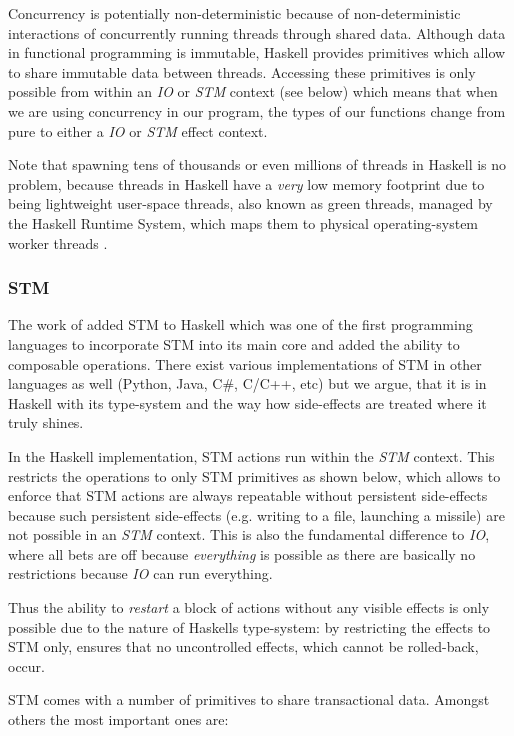 Concurrency is potentially non-deterministic because of non-deterministic interactions of concurrently running threads through shared data. Although data in functional programming is immutable, Haskell provides primitives which allow to share immutable data between threads. Accessing these primitives is only possible from within an \textit{IO} or \textit{STM} context (see below) which means that when we are using concurrency in our program, the types of our functions change from pure to either a \textit{IO} or \textit{STM} effect context.

Note that spawning tens of thousands or even millions of threads in Haskell is no problem, because threads in Haskell have a \textit{very} low memory footprint due to being lightweight user-space threads, also known as green threads, managed by the Haskell Runtime System, which maps them to physical operating-system worker threads \cite{marlow_runtime_2009}.

\subsubsection{STM}
The work of \cite{harris_composable_2005, harris_transactional_2006} added STM to Haskell which was one of the first programming languages to incorporate STM into its main core and added the ability to composable operations. There exist various implementations of STM in other languages as well (Python, Java, C\#, C/C++, etc) but we argue, that it is in Haskell with its type-system and the way how side-effects are treated where it truly shines.

In the Haskell implementation, STM actions run within the \textit{STM} context. This restricts the operations to only STM primitives as shown below, which allows to enforce that STM actions are always repeatable without persistent side-effects because such persistent side-effects (e.g. writing to a file, launching a missile) are not possible in an \textit{STM} context. This is also the fundamental difference to  \textit{IO}, where all bets are off because \textit{everything} is possible as there are basically no restrictions because \textit{IO} can run everything.

Thus the ability to \textit{restart} a block of actions without any visible effects is only possible due to the nature of Haskells type-system: by restricting the effects to STM only, ensures that no uncontrolled effects, which cannot be rolled-back, occur.

STM comes with a number of primitives to share transactional data. Amongst others the most important ones are:

